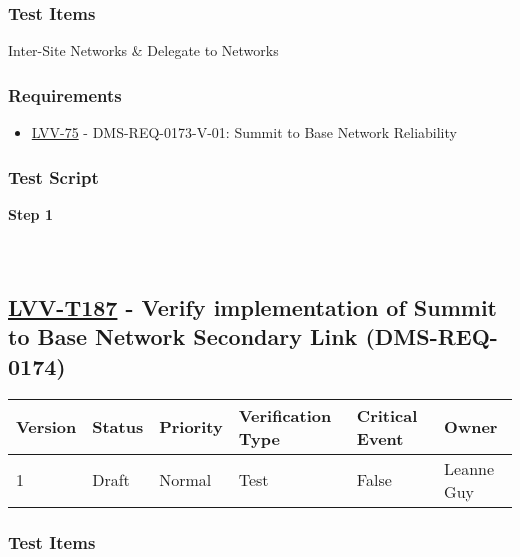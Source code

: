 \hypertarget{test-items-162}{%
\subsubsection{Test Items}\label{test-items-162}}

Inter-Site Networks \& Delegate to Networks

\hypertarget{requirements-163}{%
\subsubsection{Requirements}\label{requirements-163}}

\begin{itemize}
\tightlist
\item
  \href{https://jira.lsstcorp.org/browse/LVV-75}{LVV-75} -
  DMS-REQ-0173-V-01: Summit to Base Network Reliability
\end{itemize}

\hypertarget{test-script-163}{%
\subsubsection{Test Script}\label{test-script-163}}

\textbf{Step 1}\\
~\\
~\\

\hypertarget{lvv-t187---verify-implementation-of-summit-to-base-network-secondary-link-dms-req-0174}{%
\subsection{\texorpdfstring{\href{https://jira.lsstcorp.org/secure/Tests.jspa\#/testCase/LVV-T187}{LVV-T187}
- Verify implementation of Summit to Base Network Secondary Link
(DMS-REQ-0174)}{LVV-T187 - Verify implementation of Summit to Base Network Secondary Link (DMS-REQ-0174)}}\label{lvv-t187---verify-implementation-of-summit-to-base-network-secondary-link-dms-req-0174}}

\begin{longtable}[]{@{}llllll@{}}
\toprule
Version & Status & Priority & Verification Type & Critical Event &
Owner\tabularnewline
\midrule
\endhead
1 & Draft & Normal & Test & False & Leanne Guy\tabularnewline
\bottomrule
\end{longtable}

\hypertarget{test-items-163}{%
\subsubsection{Test Items}\label{test-items-163}}

